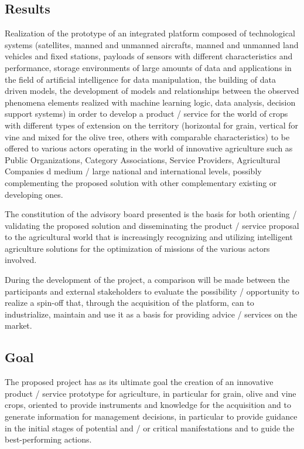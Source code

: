\documentclass[a4paper, comsoc]{IEEEtran}
\begin{document}
\lipsum[2-4]

\subsection{Results}

Realization of the prototype of an integrated platform composed of technological systems (satellites, manned and unmanned aircrafts, manned and unmanned land vehicles and fixed stations, payloads of sensors with different characteristics and performance, storage environments of large amounts of data and applications in the field of artificial intelligence for data manipulation, the building of data driven models, the development of models and relationships between the observed phenomena elements realized with machine learning logic, data analysis, decision support systems) in order to develop a product / service for the world of crops with different types of extension on the territory (horizontal for grain, vertical for vine and mixed for the olive tree, others with comparable characteristics) to be offered to various actors operating in the world of innovative agriculture such as Public Organizations, Category Associations, Service Providers, Agricultural Companies d medium / large national and international levels, possibly complementing the proposed solution with other complementary existing or developing ones.

The constitution of the advisory board presented is the basis for both orienting / validating the proposed solution and disseminating the product / service proposal to the agricultural world that is increasingly recognizing and utilizing intelligent agriculture solutions for the optimization of missions of the various actors involved.

During the development of the project, a comparison will be made between the participants and external stakeholders to evaluate the possibility / opportunity to realize a spin-off that, through the acquisition of the platform, can to industrialize, maintain and use it as a basis for providing advice / services on the market.

\lipsum[2-4]

\subsection{Goal}

The proposed project has as its ultimate goal the creation of an innovative product / service prototype for agriculture, in particular for grain, olive and vine crops, oriented to provide instruments and knowledge for the acquisition and to generate information for management decisions, in particular to provide guidance in the initial stages of potential and / or critical manifestations and to guide the best-performing actions.
\end{document}
